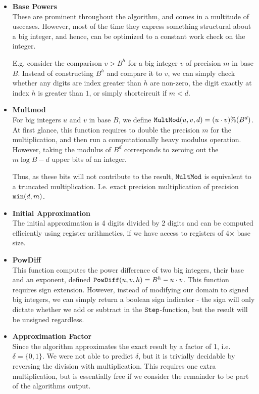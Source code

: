 \begin{itemize}[leftmargin=*]
\item \textbf{Base Powers}\\
  These are prominent throughout the algorithm, and comes in a multitude of
  usecases. However, most of the time they express something structural about a
  big integer, and hence, can be optimized to a constant work check on the
  integer.

  E.g. consider the comparison $v > B^h$ for a big integer $v$ of precision $m$
  in base $B$. Instead of constructing $B^h$ and compare it to $v$, we can
  simply check whether any digits are index greater than $h$ are non-zero, the
  digit exactly at index $h$ is greater than $1$, or simply shortcircuit if
  $m < d$.
\item \textbf{Multmod}\\
  For big integers $u$ and $v$ in base $B$, we define
  $\mathtt{MultMod}(u,v,d) = (u \cdot v) \% (B^d)$. At first glance, this function
  requires to double the precision $m$ for the multiplication, and then run a
  computationally heavy modulus operation. However, taking the modulus of $B^d$
  corresponds to zeroing out the $m \log B - d$ upper bits of an integer.

  Thus, as these bits will not contribute to the result, $\mathtt{MultMod}$ is
  equivalent to a truncated multiplication. I.e. exact precision multiplication
  of precision $\mathtt{min}(d, m)$.

\item \textbf{Initial Approximation}\\
  The initial approximation is 4 digits divided by 2 digits and can be computed
  efficiently using register arithmetics, if we have access to registers of
  4$\times$ base size.

\item \textbf{PowDiff}\\
  This function computes the power difference of two big integers, their base
  and an exponent, defined $\mathtt{PowDiff}(u, v, h) = B^h - u \cdot v$. This function
  requires sign extension. However, instead of modifying our domain to signed
  big integers, we can simply return a boolean sign indicator - the sign will
  only dictate whether we add or subtract in the $\mathtt{Step}$-function, but the
  result will be unsigned regardless.

\item \textbf{Approximation Factor}\\
  Since the algorithm approximates the exact result by a factor of 1, i.e.
  $\delta = \{0,1\}$. We were not able to predict $\delta$, but it is trivially decidable
  by reversing the division with multiplication. This requires one extra
  multiplication, but is essentially free if we consider the remainder to be
  part of the algorithms output.
\end{itemize}


